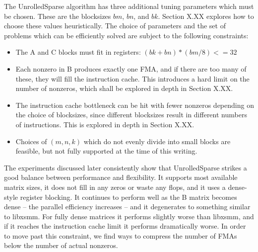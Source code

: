 The UnrolledSparse algorithm has three additional tuning parameters which must be chosen. These are the blocksizes $bm$, $bn$, and $bk$. Section X.XX explores how to choose these values heuristically. The choice of parameters and the set of problems which can be efficiently solved are subject to the following constraints:

\begin{itemize}
  \item The A and C blocks must fit in registers: $(bk + bn) * (bm / 8) <= 32$
  
  \item Each nonzero in B produces exactly one FMA, and if there are too many of these, they will fill the instruction cache. This introduces a hard limit on the number of nonzeros, which shall be explored in depth in Section X.XX.
  
  \item The instruction cache bottleneck can be hit with fewer nonzeros depending on the choice of blocksizes, since different blocksizes result in different numbers of  instructions. This is explored in depth in Section X.XX.

  \item Choices of $(m,n,k)$ which do not evenly divide into small blocks are feasible, but not fully supported at the time of this writing.
\end{itemize}

The experiments discussed later consistently show that UnrolledSparse strikes a good balance between performance and flexibility. It supports most available matrix sizes, it does not fill in any zeros or waste any flops, and it uses a dense-style register blocking. It continues to perform well as the B matrix becomes dense -- the parallel efficiency increases -- and it degenerates to something similar to libxsmm. For fully dense matrices it performs slightly worse than libxsmm, and if it reaches the instruction cache limit it performs dramatically worse. In order to move past this constraint, we find ways to compress the number of FMAs below the number of actual nonzeros.

